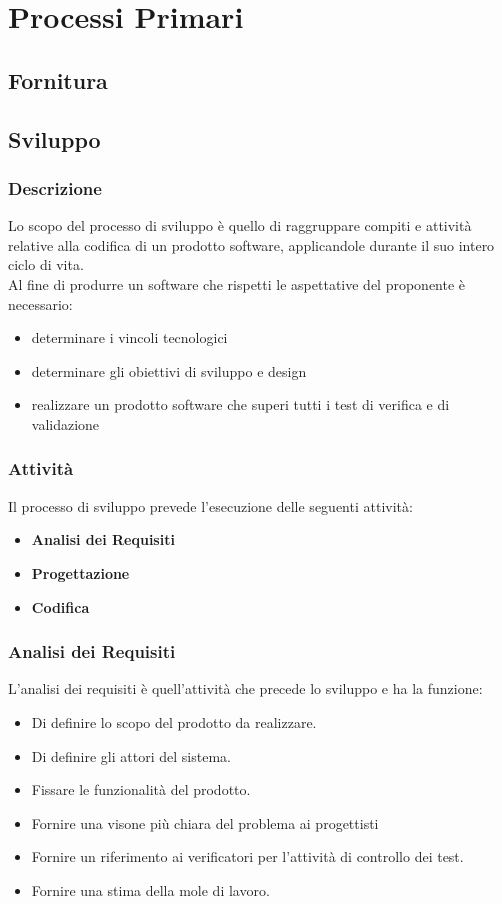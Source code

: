 \chapter{Processi Primari}

\section{Fornitura}
\section{Sviluppo}

\subsection{Descrizione}
  Lo scopo del processo di sviluppo è quello di raggruppare compiti e attività relative alla codifica di un prodotto software, applicandole durante il suo intero ciclo di vita. \\
  Al fine di produrre un software che rispetti le aspettative del proponente è necessario: 
  \begin{itemize}
    \item determinare i vincoli tecnologici
    \item determinare gli obiettivi di sviluppo e design
    \item realizzare un prodotto software che superi tutti i test di verifica e di validazione
  \end{itemize}
  \subsection{Attività}

  Il processo di sviluppo prevede l'esecuzione delle seguenti attività:
  \begin{itemize}
    \item \textbf{Analisi dei Requisiti}
    \item \textbf{Progettazione}
    \item \textbf{Codifica}
  \end{itemize}
  \subsection{Analisi dei Requisiti}
    L'analisi dei requisiti è quell'attività che precede lo sviluppo e ha la funzione:
    \begin{itemize}
      \item Di definire lo scopo del prodotto da realizzare.
      \item Di definire gli attori del sistema.
      \item Fissare le funzionalità del prodotto.
      \item Fornire una visone più chiara del problema ai progettisti
      \item Fornire un riferimento ai verificatori per l'attività di controllo dei test.
      \item Fornire una stima della mole di lavoro.
    \end{itemize}
